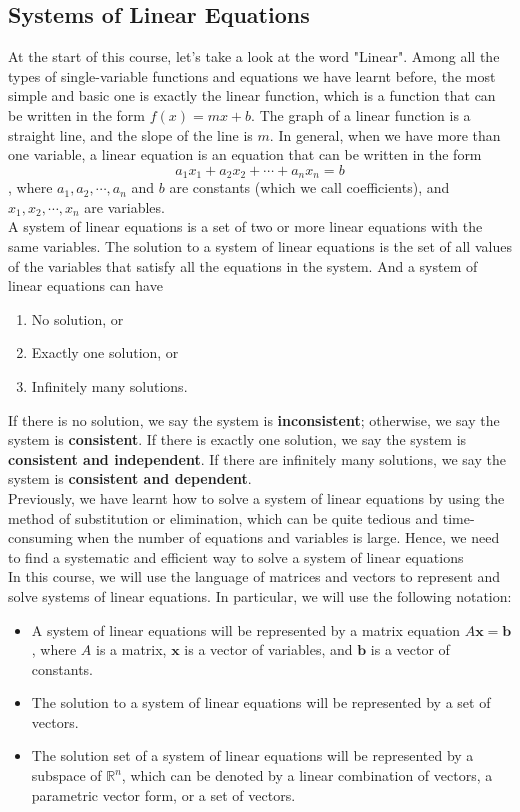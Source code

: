 \documentclass[10pt, a4paper]{article}
\begin{document}
\subsection{Systems of Linear Equations}
\indent At the start of this course, let's take a look at the word "Linear". 
Among all the types of single-variable functions and equations we have learnt before, the most simple and basic one is exactly the linear function, which is a function that can be written in the form $f(x)=mx+b$. The graph of a linear function is a straight line, and the slope of the line is $m$.
In general, when we have more than one variable, a linear equation is an equation that can be written in the form $$a_1x_1+a_2x_2+\cdots+a_nx_n=b$$, where $a_1, a_2, \cdots, a_n$ and $b$ are constants (which we call coefficients), and $x_1, x_2, \cdots, x_n$ are variables.\\
\indent A system of linear equations is a set of two or more linear equations with the same variables. The solution to a system of linear equations is the set of all values of the variables that satisfy all the equations in the system. And a system of linear equations can have 
\begin{enumerate}
    \item No solution, or
    \item Exactly one solution, or
    \item Infinitely many solutions.
\end{enumerate}
If there is no solution, we say the system is \textbf{inconsistent}; otherwise, we say the system is \textbf{consistent}.
If there is exactly one solution, we say the system is \textbf{consistent and independent}. If there are infinitely many solutions, we say the system is \textbf{consistent and dependent}.\\
\indent Previously, we have learnt how to solve a system of linear equations by using the method of substitution or elimination, which can be quite tedious and time-consuming when the number of equations and variables is large.
Hence, we need to find a systematic and efficient way to solve a system of linear equations\\
\indent In this course, we will use the language of matrices and vectors to represent and solve systems of linear equations. In particular, we will use the following notation:
\begin{itemize}
    \item A system of linear equations will be represented by a matrix equation $A\mathbf{x}=\mathbf{b}$, where $A$ is a matrix, $\mathbf{x}$ is a vector of variables, and $\mathbf{b}$ is a vector of constants.
    \item The solution to a system of linear equations will be represented by a set of vectors.
    \item The solution set of a system of linear equations will be represented by a subspace of $\mathbb{R}^n$, which can be denoted by a linear combination of vectors, a parametric vector form, or a set of vectors.
\end{itemize}
\end{document}
